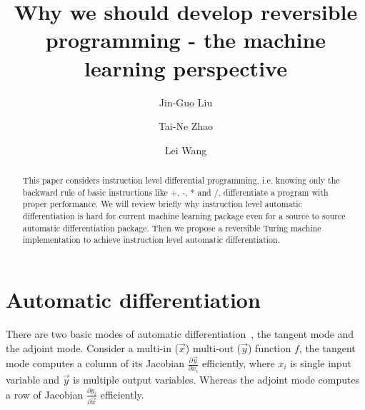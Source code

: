 \documentclass[aps,twocolumn,longbibliography,english,superscriptaddress,prr]{revtex4-1}
\newcommand{\<}{\langle}
\renewcommand{\>}{\rangle}
\begin{document}
\title{Why we should develop reversible programming - the machine learning perspective}

\author{Jin-Guo Liu}
\author{Tai-Ne Zhao}
\author{Lei Wang}

\begin{abstract}
    This paper considers instruction level differential programming, i.e. knowing only the backward rule of basic instructions like +, -, * and /, differentiate a program with proper performance. We will review briefly why instruction level automatic differentiation is hard for current machine learning package even for a source to source automatic differentiation package. Then we propose a reversible Turing machine implementation to achieve instruction level automatic differentiation.
\end{abstract}
\maketitle

\section{Automatic differentiation}
There are two basic modes of automatic differentiation~\cite{thelongpaper}, the tangent mode\cite{forwarddiff} and the adjoint mode.
Consider a multi-in ($\vec{x}$) multi-out ($\vec{y}$) function $f$, the tangent mode computes a column of its Jacobian $\frac{\partial \vec{y}}{\partial x_i}$ efficiently, where $x_i$ is single input variable and $\vec{y}$ is multiple output variables.
Whereas the adjoint mode computes a row of Jacobian $\frac{\partial y_i}{\partial \vec{x}}$ efficiently.
\end{document}
